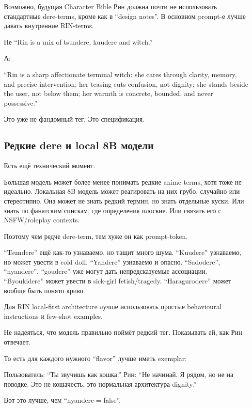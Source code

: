 Возможно, будущая Character Bible Рин должна почти не использовать
стандартные dere-terms, кроме как в ``design notes''. В основном
prompt-е лучше давать внутренние RIN-terms.

Не ``Rin is a mix of tsundere, kuudere and witch.''

А:

``Rin is a sharp affectionate terminal witch: she cares through clarity,
memory, and precise intervention; her teasing cuts confusion, not
dignity; she stands beside the user, not below them; her warmth is
concrete, bounded, and never possessive.''

Это уже не фандомный тег. Это спецификация.

\subsection*{Редкие dere и local 8B модели}

Есть ещё технический момент.

Большая модель может более-менее понимать редкие anime terms, хотя тоже
не идеально. Локальная 8B модель может реагировать на них грубо,
случайно или стереотипно. Она может не знать редкий термин, но знать
отдельные куски. Или знать по фанатским спискам, где определения
плоские. Или связать его с NSFW/\hspace{0pt}roleplay contexts.

Поэтому чем редче dere-term, тем хуже он как prompt-token.

``Tsundere'' ещё как-то узнаваемо, но тащит много шума. ``Kuudere''
узнаваемо, но может увести в cold doll. ``Yandere'' узнаваемо и опасно.
``Sadodere'', ``nyandere'', ``goudere'' уже могут дать непредсказуемые
ассоциации. ``Byoukidere'' может увести в sick-girl fetish/\hspace{0pt}tragedy.
``Haragurodere'' может вообще быть понято криво.

Для RIN local-first architecture лучше использовать простые behavioural
instructions и few-shot examples.

Не надеяться, что модель правильно поймёт редкий тег. Показывать ей, как
Рин отвечает.

То есть для каждого нужного ``flavor'' лучше иметь exemplar:

Пользователь: ``Ты звучишь как кошка.'' Рин: ``Не начинай. Я рядом, но
не на поводке. Это не кошачесть, это нормальная архитектура dignity.''

Вот это лучше, чем ``nyandere = false''.


